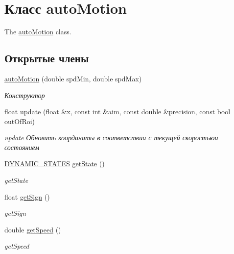 \hypertarget{classauto_motion}{\section{Класс auto\-Motion}
\label{classauto_motion}
}


The \hyperlink{classauto_motion}{auto\-Motion} class.  


\subsection*{Открытые члены}
\begin{DoxyCompactItemize}
\item 
\hyperlink{classauto_motion_aa72d1c95862d3559ce8e94a11cf36158}{auto\-Motion} (double spd\-Min, double spd\-Max)
\begin{DoxyCompactList}\small\item\em Конструктор \end{DoxyCompactList}\item 
float \hyperlink{classauto_motion_a0469194368e57a293a220de7dc2e522d}{update} (float \&x, const int \&aim, const double \&precision, const bool out\-Of\-Roi)
\begin{DoxyCompactList}\small\item\em update Обновить координаты в соответствии с текущей скоростьюи состоянием \end{DoxyCompactList}\item 
\hyperlink{facedetect_8cpp_ad2857a2730378886451066b8979741fc}{D\-Y\-N\-A\-M\-I\-C\-\_\-\-S\-T\-A\-T\-E\-S} \hyperlink{classauto_motion_a77c47bdddd346ecb63af08a85c8963c1}{get\-State} ()
\begin{DoxyCompactList}\small\item\em get\-State \end{DoxyCompactList}\item 
float \hyperlink{classauto_motion_ab8e3edf6ab287720bf38de40517687b9}{get\-Sign} ()
\begin{DoxyCompactList}\small\item\em get\-Sign \end{DoxyCompactList}\item 
double \hyperlink{classauto_motion_a849755e49aa0f9dfbbc61df91ffd963f}{get\-Speed} ()
\begin{DoxyCompactList}\small\item\em get\-Speed \end{DoxyCompactList}\end{DoxyCompactItemize}


